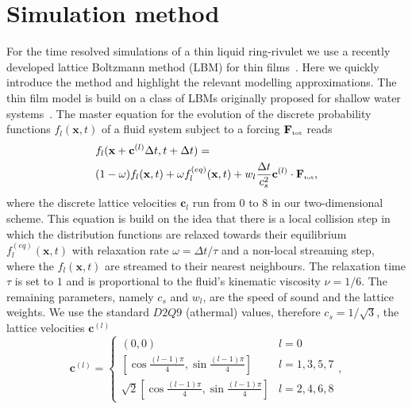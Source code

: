 \documentclass[twoside,twocolumn,9pt]{article}
\begin{document}
\section{Simulation method}
\label{sec:method}
For the time resolved simulations of a thin liquid ring-rivulet we use a recently developed lattice Boltzmann method (LBM) for thin films~\cite{zitzLatticeBoltzmannMethod2019, zitzSwalbeJlLattice2022}. 
Here we quickly introduce the method and highlight the relevant modelling approximations.
The thin film model is build on a class of LBMs originally proposed for shallow water systems~\cite{salmonLatticeBoltzmannMethod1999, dellarNonhydrodynamicModesPriori2002}.
The master equation for the evolution of the discrete probability functions $f_l(\mathbf{x},t)$ of a fluid system subject to a forcing $\mathbf{F}_{\mbox{\tiny{tot}}}$ reads
\begin{equation}\label{eq:LBE}
\begin{split}
&f_l(\mathbf{x}+\mathbf{c}^{(l)}\Delta t,t+\Delta t) = \\
&(1 - \omega) f_l(\mathbf{x},t) + \omega f_l^{(eq)}(\mathbf{x},t) + w_l \frac{\Delta t}{c_s^2} \mathbf{c}^{(l)} \cdot \mathbf{F}_{\mbox{\tiny{tot}}},
\end{split}
\end{equation}
where the discrete lattice velocities $\mathbf{c}_l$ run from $0$ to $8$ in our two-dimensional scheme.
This equation is build on the idea that there is a local collision step in which the distribution functions are relaxed towards their equilibrium $f_l^{(eq)}(\mathbf{x},t)$ with relaxation rate $\omega = \Delta t/\tau$ and a non-local streaming step, where the $f_l(\mathbf{x},t)$ are streamed to their nearest neighbours.
The relaxation time $\tau$ is set to $1$ and is proportional to the fluid's kinematic viscosity $\nu = 1/6$.  
The remaining parameters, namely $c_s$ and $w_l$, are the speed of sound and the lattice weights. 
We use the standard $D2Q9$ (athermal) values, therefore $c_s = 1/\sqrt{3}$, the lattice velocities $\mathbf{c}^{(l)}$~\cite{krugerLatticeBoltzmannMethod2017, zitzLatticeBoltzmannMethod2019, salmonLatticeBoltzmannMethod1999}   
\begin{equation}\label{eq:speeds}
\mathbf{c}^{(l)}  =
\left\{
\begin{array}{ll}
(0,0) & l = 0 \\
\left[\cos{\frac{(l-1)\pi}{4}}, \sin{\frac{(l-1)\pi}{4}} \right] &  l=1,3,5,7 \\
\sqrt{2}\left[\cos{\frac{(l-1)\pi}{4}}, \sin{\frac{(l-1)\pi}{4}} \right] & l=2,4,6,8
\end{array}
\right.,
\end{equation}
\end{document}
